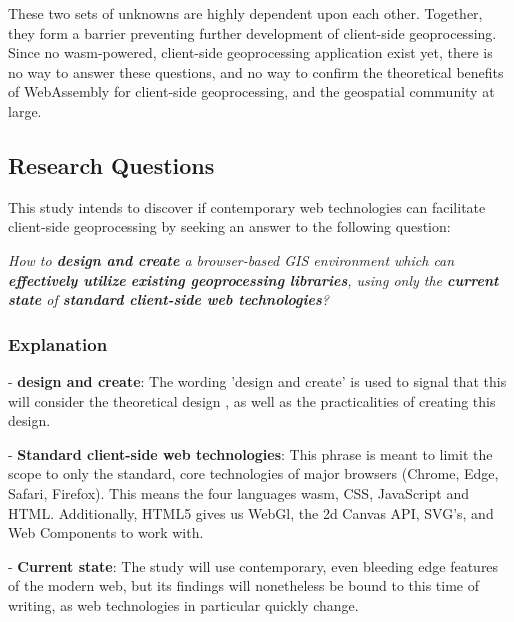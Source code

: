 These two sets of unknowns are highly dependent upon each other. Together, they form a barrier preventing further development of client-side geoprocessing. Since no wasm-powered, client-side geoprocessing application exist yet, there is no way to answer these questions, and no way to confirm the theoretical benefits of WebAssembly for client-side geoprocessing, and the geospatial community at large.


\newpage

\subsection{Research Questions}

This study intends to discover if contemporary web technologies can facilitate client-side geoprocessing by seeking an answer to the following question:  

\textit{How to \textbf{design and create} a browser-based GIS environment which can \textbf{effectively utilize} \textbf{existing geoprocessing libraries}, using only the \textbf{current state} of \textbf{standard client-side web technologies}?}

\subsubsection*{Explanation}


- \textbf{design and create}: The wording 'design and create' is used to signal that this will consider the theoretical design , as well as the practicalities of creating this design. 

- \textbf{Standard client-side web technologies}: This phrase is meant to limit the scope to only the standard, core technologies of major browsers (Chrome, Edge, Safari, Firefox). This means the four languages \ac{wasm}, CSS, JavaScript and HTML. Additionally, HTML5 gives us WebGl, the 2d Canvas API, SVG's, and Web Components to work with.

- \textbf{Current state}: The study will use contemporary, even bleeding edge features of the modern web, but its findings will nonetheless be bound to this time of writing, as web technologies in particular quickly change. 


